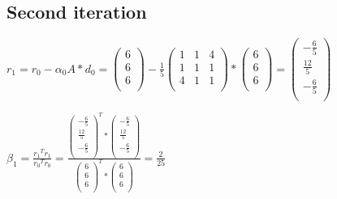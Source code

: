 \documentclass[10pt,DIV10,a4paper]{scrartcl}
\begin{document}
\subsection*{Second iteration}

\(r_1=r_0- \alpha _0 A * d_0=\left(
\begin{array}{c}
 6 \\
 6 \\
 6 \\
\end{array}
\right)-\frac{1}{5} \left(
\begin{array}{ccc}
 1 & 1 & 4 \\
 1 & 1 & 1 \\
 4 & 1 & 1 \\
\end{array}
\right) *\left(
\begin{array}{c}
 6 \\
 6 \\
 6 \\
\end{array}
\right) = \left(
\begin{array}{c}
 -\frac{6}{5} \\
 \frac{12}{5} \\
 -\frac{6}{5} \\
\end{array}
\right)\)

\(\beta _1= \frac{r_1{}^Tr_1}{r_0{}^Tr_0}=\frac{\left(
\begin{array}{c}
 -\frac{6}{5} \\
 \frac{12}{5} \\
 -\frac{6}{5} \\
\end{array}
\right)^T* \left(
\begin{array}{c}
 -\frac{6}{5} \\
 \frac{12}{5} \\
 -\frac{6}{5} \\
\end{array}
\right)}{\left(
\begin{array}{c}
 6 \\
 6 \\
 6 \\
\end{array}
\right)^T* \left(
\begin{array}{c}
 6 \\
 6 \\
 6 \\
\end{array}
\right)}=\frac{2}{25}\)
\end{document}
